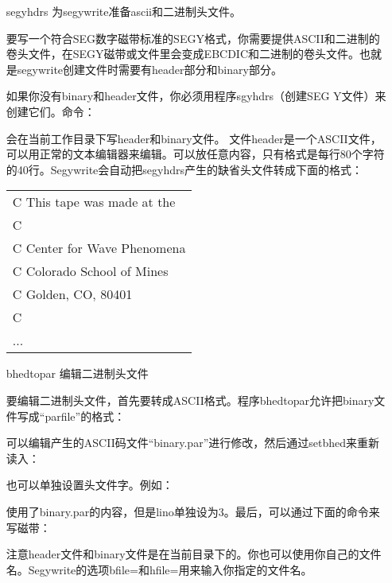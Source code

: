 \begin{enumerate}
	\item[segyhdrs] 为segywrite准备ascii和二进制头文件。\par
	要写一个符合SEG数字磁带标准的SEGY格式，你需要提供ASCII和二进制的卷头文件，在SEGY磁带或文件里会变成EBCDIC和二进制的卷头文件。也就是segywrite创建文件时需要有header部分和binary部分。\par
	如果你没有binary和header文件，你必须用程序sgyhdrs（创建SEG Y文件）来创建它们。命令：\par
	\par\mvspace
	会在当前工作目录下写header和binary文件。
	文件header是一个ASCII文件，可以用正常的文本编辑器来编辑。可以放任意内容，只有格式是每行80个字符的40行。Segywrite会自动把segyhdrs产生的缺省头文件转成下面的格式：\par
	\mvspace
	\begin{tabular}{|l|}
		\hline
		C This tape was made at the\\
		C\\
		C Center for Wave Phenomena\\
		C Colorado School of Mines\\
		C Golden, CO, 80401\\
		C\\
		...\\
	   \hline
	\end{tabular}
	\item[bhedtopar] 编辑二进制头文件\par
	要编辑二进制头文件，首先要转成ASCII格式。程序bhedtopar允许把binary文件写成“parfile”的格式：\par
	\par\mvspace
	可以编辑产生的ASCII码文件“binary.par”进行修改，然后通过setbhed来重新读入：\par
	\par\mvspace
	也可以单独设置头文件字。例如：\par
	\par\mvspace
	使用了binary.par的内容，但是lino单独设为3。最后，可以通过下面的命令来写磁带：\par
	\par\mvspace
	注意header文件和binary文件是在当前目录下的。你也可以使用你自己的文件名。Segywrite的选项bfile=和hfile=用来输入你指定的文件名。
\end{enumerate}


